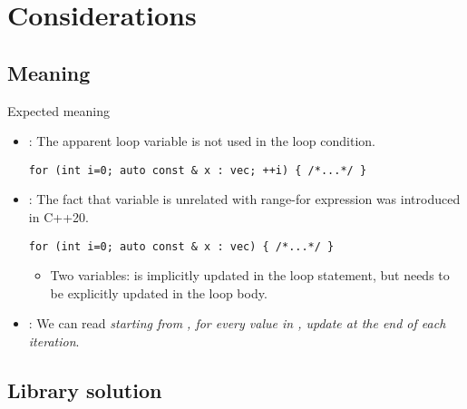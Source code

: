 \section{Considerations}

\subsection{Meaning}

\begin{frame}[t,fragile]{Expected meaning}
\begin{itemize}
  \item {}: The apparent loop variable  is not used in the loop
        condition.
\begin{lstlisting}
for (int i=0; auto const & x : vec; ++i) { /*...*/ }
\end{lstlisting}

  \item {}:
        The fact that variable  is unrelated with range-for expression
        was introduced in C++20.
\begin{lstlisting}
for (int i=0; auto const & x : vec) { /*...*/ }
\end{lstlisting}
    \begin{itemize}
      \item Two variables: 
             is implicitly updated in the loop statement,
            but  needs to be explicitly updated in the loop body.
    \end{itemize}


  \item {}:
        We can read \emph{starting from , for every value 
        in , update  at the end of each iteration}.
        
\end{itemize}
\end{frame}

\subsection{Library solution}

